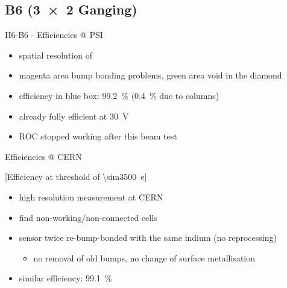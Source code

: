\subsection{B6 (\SI{3x2}{} Ganging)}
\begin{frame}{II6-B6 - Efficiencies @ PSI}

	
	\begin{itemize}\itemfill
		\item spatial resolution of 
		\item magenta area \ra bump bonding problems, green area \ra void in the diamond
		\item efficiency in blue box: \SI{99.2}{\%} (\ra \SI{.4}{\%} due to columns)
		\item already fully efficient at \SI{30}{\volt}
		\item ROC stopped working after this beam test
	\end{itemize}
	
\end{frame}
% 
% 	
% 	
\begin{frame}{Efficiencies @ CERN}

	\vspace*{-2ex}[Efficiency at threshold of \SI{\sim3500}{e}]\vspace*{-2ex}
	
	\begin{itemize}\itemfill
		\item high resolution measurement at CERN
		\item find non-working/non-connected cells
		\item sensor twice re-bump-bonded with the same indium (no reprocessing)
		\begin{itemize}
			\item no removal of old bumps, no change of surface metallisation
		\end{itemize}
		\item similar efficiency: \SI{99.1}{\%}
	\end{itemize}
	
\end{frame}
